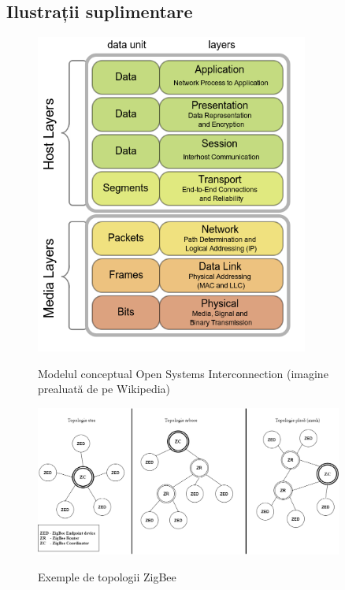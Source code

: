 \begin{appendices}
\chapter{Ilustrații suplimentare}
\label{apx:ilustratii}

\begin{figure}[h]
    \centering
    \caption{\centering Modelul conceptual Open Systems Interconnection \newline (imagine prealuată de pe Wikipedia)}
    \includegraphics[width=0.8\textwidth]{images/OSI_Model_v1.png}
    \label{fig:osi_model}
\end{figure}

\begin{figure}[h]
    \centering
    \caption{Exemple de topologii ZigBee}
    \includegraphics[width=0.9\textwidth]{images/topologii.drawio.png}
    \label{fig:zigbee_networks}
\end{figure}

\end{appendices}